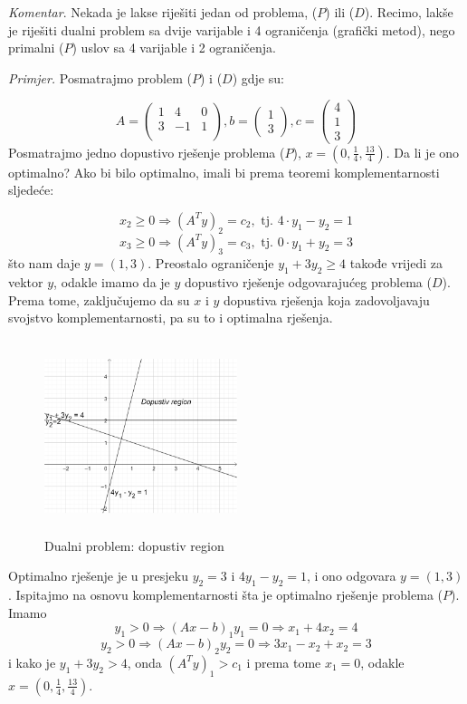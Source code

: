\documentclass[a4paper, utf8, 11pt, colorlinks]{article}
\begin{document}
\emph{Komentar}.  Nekada je lakse riješiti jedan od problema, ($P$)  ili  ($D$).  Recimo, lakše je riješiti dualni problem sa dvije varijable i 4 ograničenja (grafički metod), nego primalni  ($P$)  uslov sa 4 varijable i 2 ograničenja. 

\emph{Primjer.} Posmatrajmo problem  ($P$)  i  ($D$)  gdje su:
 
$$      A = \left(\begin{array}{ccc}
          1 &  4 & 0 \\
          3 & -1 & 1 \\
      \end{array} \right ), b = \left (\begin{array}{c}
           1 \\
           3
      \end{array}\right ), c =\left ( \begin{array}{c}
           4  \\
           1  \\
           3
      \end{array} \right )
 $$
Posmatrajmo jedno dopustivo rješenje problema  ($P$), $x = (0, \frac{1}{4}, \frac{13}{4})$. Da li je ono optimalno? Ako bi bilo optimalno, imali bi prema teoremi komplementarnosti sljedeće:

$$x_2 \geq 0 \Rightarrow  (A^T y)_2  = c_2, \mbox{ tj. } 4 \cdot y_1 - y_2 = 1$$
$$x_3 \geq 0 \Rightarrow  (A^T y)_3  = c_3, \mbox{ tj. } 0 \cdot y_1 + y_2 = 3$$
što nam daje  $y = (1, 3)$. Preostalo ograničenje $y_1 + 3 y_2 \geq 4$ takođe vrijedi za vektor $y$, odakle imamo da je $y$ dopustivo rješenje odgovarajućeg problema  ($D$).  Prema tome, zaključujemo da su $x$ i $y$ dopustiva rješenja koja zadovoljavaju svojstvo komplementarnosti, pa su to i optimalna rješenja. 

\begin{figure}[!ht]
    \centering
     \includegraphics[width=160pt, height=160pt]{fig5.eps}
    \caption{Dualni problem: dopustiv region}
    \label{fig:fig5}
\end{figure}
Optimalno rješenje je u presjeku $y_2 = 3$ i $4y_1 - y_2 = 1$, i ono odgovara $y = (1, 3)$. Ispitajmo na osnovu komplementarnosti šta je optimalno rješenje problema ($P$). Imamo 
$$y_1 > 0 \Rightarrow (Ax - b)_1 y_1 = 0 \Rightarrow x_1 + 4 x_2 = 4 $$
$$y_2 > 0 \Rightarrow (Ax - b)_2 y_2 = 0 \Rightarrow 3x_1 - x_2 + x_2 = 3 $$
i kako je $y_1 + 3 y_2 > 4$, onda $(A^Ty)_1 > c_1$ i prema tome $x_1 =0$, 
odakle $x =(0, \frac{1}{4}, \frac{13}{4})$. 
\end{document}
